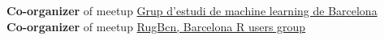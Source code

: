 \documentclass[a4paper, oneside]{scrreprt}
\begin{document}
\noindent\makebox[\linewidth]{\rule{\textwidth}{0.4pt}}

\vspace{0.3cm}

\noindent
\begin{minipage}{0.9\textwidth}
  \noindent\llap{\FA \faCar\ \ }\textbf{Co-organizer} of meetup
  \href{https://www.meetup.com/Grup-destudid-e-machine-learning-de-Barcelona/}
  {Grup d'estudi de machine learning de Barcelona}\\
  \noindent\llap{\FA \faAreaChart\ \ }\textbf{Co-organizer} of meetup
  \href{https://www.meetup.com/RugBcn-Barcelona-R-users-group/}{RugBcn, Barcelona R users group}\\
\end{minipage}\hfill
\ \\
\noindent\makebox[\linewidth]{\rule{\textwidth}{0.4pt}}
\end{document}
